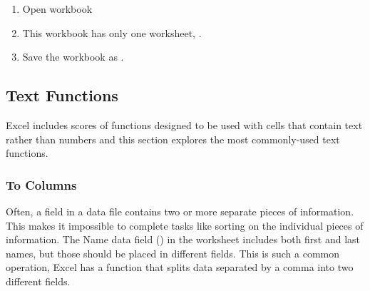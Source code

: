 \begin{enumerate}
	\item Open workbook 
	\item This workbook has only one worksheet, .
	\item Save the workbook as .
\end{enumerate}

\subsection{Text Functions}

Excel includes scores of functions designed to be used with cells that contain text rather than numbers and this section explores the most commonly-used text functions.

\subsubsection{To Columns}

Often, a field in a data file contains two or more separate pieces of information. This makes it impossible to complete tasks like sorting on the individual pieces of information. The Name data field () in the  worksheet includes both first and last names, but those should be placed in different fields. This is such a common operation, Excel has a function that splits data separated by a comma into two different fields.

